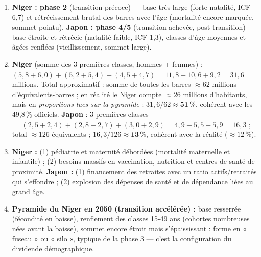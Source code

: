 \documentclass[11pt]{article}
\newcommand{\cle}[1]{{\popxbold\color{popdark}#1}}
\begin{document}
\begin{corrige}
\begin{enumerate}
    \item \textbf{Niger : phase 2} (transition précoce) — base très large (forte natalité, ICF 6,7) et rétrécissement brutal des barres avec l'âge (mortalité encore marquée, sommet pointu). \textbf{Japon : phase 4/5} (transition achevée, post-transition) — base étroite et rétrécie (natalité faible, ICF 1,3), classes d'âge moyennes et âgées renflées (vieillissement, sommet large).
    \item \textbf{Niger} (somme des 3 premières classes, hommes + femmes) : $(5,8+6,0)+(5,2+5,4)+(4,5+4,7) = 11,8+10,6+9,2 = 31,6$ millions. Total approximatif : somme de toutes les barres $\approx 62$ millions d'équivalents-barres ; en réalité le Niger compte $\approx 26$ millions d'habitants, mais en \emph{proportions lues sur la pyramide} : $31,6/62 \approx \mathbf{51\,\%}$, cohérent avec les 49,8\,\% officiels. \textbf{Japon} : 3 premières classes $= (2,5+2,4)+(2,8+2,7)+(3,0+2,9) = 4,9+5,5+5,9 = 16,3$ ; total $\approx 126$ équivalents ; $16,3/126 \approx \mathbf{13\,\%}$, cohérent avec la réalité ($\approx 12\,\%$).
    \item \textbf{Niger :} (1) pédiatrie et maternité débordées (mortalité maternelle et infantile) ; (2) besoins massifs en vaccination, nutrition et centres de santé de proximité. \textbf{Japon :} (1) financement des retraites avec un ratio actifs/retraités qui s'effondre ; (2) explosion des dépenses de santé et de dépendance liées au grand âge.
    \item \textbf{Pyramide du Niger en 2050 (transition accélérée) :} base resserrée (fécondité en baisse), renflement des classes 15-49 ans (cohortes nombreuses nées avant la baisse), sommet encore étroit mais s'épaississant : forme en « fuseau » ou « silo », typique de la phase 3 — c'est la configuration du \cle{dividende démographique}.
\end{enumerate}
\end{corrige}
\end{document}
